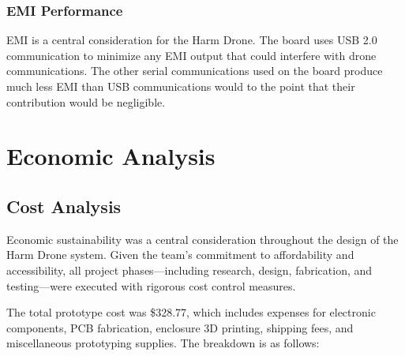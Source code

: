 \documentclass[12pt]{article}
\begin{document}
\subsubsection{EMI Performance}
EMI is a central consideration for the Harm Drone. The board uses USB 2.0 communication to minimize any EMI output that could interfere with drone communications. The other serial communications used on the board produce much less EMI than USB communications would to the point that their contribution would be negligible.

\section{Economic Analysis}

\subsection{Cost Analysis}

\par Economic sustainability was a central consideration throughout the design of the Harm Drone system. Given the team's commitment to affordability and accessibility, all project phases—including research, design, fabrication, and testing—were executed with rigorous cost control measures.

\par The total prototype cost was \$328.77, which includes expenses for electronic components, PCB fabrication, enclosure 3D printing, shipping fees, and miscellaneous prototyping supplies. The breakdown is as follows:
\end{document}
